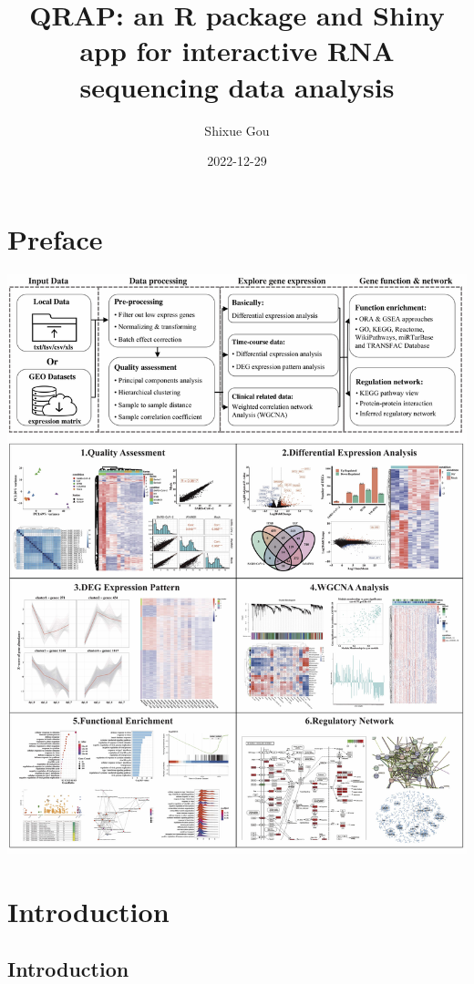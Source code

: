 \documentclass[
  a4paper,
  oneside]{book}
\title{QRAP: an R package and Shiny app for interactive RNA sequencing data analysis}
\author{Shixue Gou}
\date{2022-12-29}
\begin{document}
\maketitle

{
\hypersetup{linkcolor=}
\setcounter{tocdepth}{2}
\tableofcontents
}
\hypertarget{preface}{%
\chapter*{Preface}\label{preface}}

\includegraphics{images/workflow.jpg}

\hypertarget{intro}{%
\chapter{Introduction}\label{intro}}

\hypertarget{introduction}{%
\section{Introduction}\label{introduction}}
\end{document}
